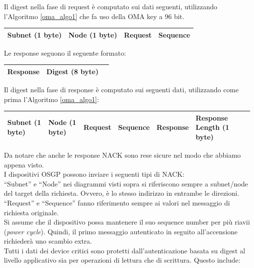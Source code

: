 \newline
Il digest nella fase di request è computato sui dati seguenti, utilizzando l'Algoritmo \ref{oma_algo1} che fa uso della OMA key a 96 bit.\\
\begin{table}[!h]
	\centering
	\begin{tabular}{|l|l|l|l|}
		\hline
		Subnet (1 byte) & Node (1 byte) & Request & Sequence\\ \hline
	\end{tabular}
\end{table}
\newline
Le response seguono il seguente formato:
\begin{table}[!h]
	\centering
	\begin{tabular}{|l|l|l|}
		\hline
		Response & Digest (8 byte)\\ \hline
	\end{tabular}
\end{table}
\newline
\newline
Il digest nella fase di response è computato sui seguenti dati, utilizzando come prima l'Algoritmo \ref{oma_algo1}:
\begin{table}[!h]
	\centering
	\begin{tabular}{|l|l|l|l|l|l|}
		\hline
		Subnet (1 byte) & Node (1 byte) & Request & Sequence & Response & Response Length (1 byte)\\ \hline
	\end{tabular}
\end{table}
\newline
Da notare che anche le response NACK sono rese sicure nel modo che abbiamo appena visto.\\
I dispositivi OSGP possono inviare i seguenti tipi di NACK:\\
``Subnet'' e ``Node'' nei diagrammi visti sopra si riferiscono sempre a subnet/node del target della richiesta. Ovvero, è lo stesso indirizzo in entrambe le direzioni. ``Request'' e ``Sequence'' fanno riferimento sempre ai valori nel messaggio di richiesta originale.\\
Si assume che il dispositivo possa mantenere il suo sequence number per più riavii (\emph{power cycle}). Quindi, il primo messaggio autenticato in seguito all'accensione richiederà uno scambio extra.\\
Tutti i dati dei device critici sono protetti dall'autenticazione basata su digest al livello applicativo sia per operazioni di lettura che di scrittura. Questo include:\\
